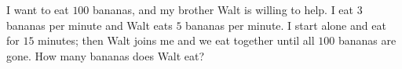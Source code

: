 I want to eat $100$ bananas, and my brother Walt is willing to help. I eat $3$ bananas per minute and Walt eats $5$ bananas per minute. I start alone and eat for $15$ minutes; then Walt joins me and we eat together until all $100$ bananas are gone. How many bananas does Walt eat?
